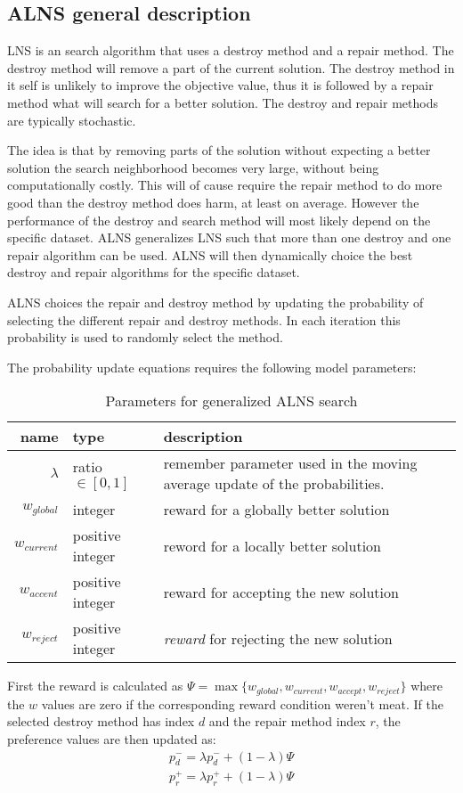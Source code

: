 \subsection{ALNS general description}

LNS is an search algorithm that uses a destroy method and a repair method. The destroy method will remove a part of the current solution. The destroy method in it self is unlikely to improve the objective value, thus it is followed by a repair method what will search for a better solution. The destroy and repair methods are typically stochastic.

The idea is that by removing parts of the solution without expecting a better solution the search neighborhood becomes very large, without being computationally costly. This will of cause require the repair method to do more good than the destroy method does harm, at least on average. However the performance of the destroy and search method will most likely depend on the specific dataset. ALNS generalizes LNS such that more than one destroy and one repair algorithm can be used. ALNS will then dynamically choice the best destroy and repair algorithms for the specific dataset.

ALNS choices the repair and destroy method by updating the probability of selecting the different repair and destroy methods. In each iteration this probability is used to randomly select the method.

The probability update equations requires the following model parameters:

\begin{table}[H]
\centering
\begin{tabular}{r|p{2.5cm}|p{6cm}}
	name & type & description \\ \hline
	$\lambda$ & ratio $\in [0, 1]$ & remember parameter used in the moving average update of the probabilities. \\
	$w_{global}$ & integer & reward for a globally better solution \\
	$w_{current}$ & positive integer & reword for a locally better solution \\
	$w_{accent}$ & positive integer & reward for accepting the new solution \\
	$w_{reject}$ & positive integer & \textit{reward} for rejecting the new solution
\end{tabular}
\caption{Parameters for generalized ALNS search}
\end{table}

First the reward is calculated as $\Psi = \max\{w_{global}, w_{current}, w_{accept}, w_{reject}\}$ where the $w$ values are zero if the corresponding reward condition weren't meat. If the selected destroy method has index $d$ and the repair method index $r$, the preference values are then updated as:
\begin{align}
p_d^- = \lambda p_d^- + (1 - \lambda)\Psi \\
p_r^+ = \lambda p_r^+ + (1 - \lambda)\Psi
\end{align}

